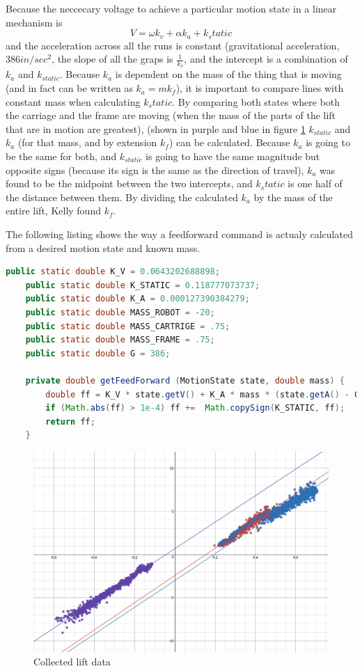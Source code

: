 \documentclass{article}
\begin{document}
Because the neccecary voltage to achieve a particular motion state in a linear mechanism is $$V = \omega k_v + \alpha k_a + k_static$$ 
and the acceleration across all the runs is constant (gravitational acceleration, $386 in/sec^2$, the slope of all the graps is $\frac{1}{k_v}$, and the intercept is a combination of $k_a$ and $k_{static}$. Because $k_a$ is dependent on the mass of the thing that is moving (and in fact can be written as $k_a = m k_f$), it is important to compare lines with constant mass when calculating $k_static$. By comparing both states where both the carriage and the frame are moving (when the mass of the parts of the lift that are in motion are greatest), (shown in purple and blue in figure \ref{fig:liftData} $k_{static}$ and $k_a$ (for that mass, and by extension $k_f$) can be calculated. Because $k_a$ is going to be the same for both, and $k_{static}$ is going to have the same magnitude but opposite signs (because its sign is the same as the direction of travel), $k_a$ was found to be the midpoint between the two intercepts, and $k_static$ is one half of the distance between them. By dividing the calculated $k_a$ by the mass of the entire lift, Kelly found $k_f$. 

The following listing shows the way a feedforward command is actualy calculated from a desired motion state and known mass.
\begin{lstlisting}[language=Java]
    public static double K_V = 0.0643202688898;
    public static double K_STATIC = 0.118777073737;
    public static double K_A = 0.000127390384279;
    public static double MASS_ROBOT = -20;
    public static double MASS_CARTRIGE = .75;
    public static double MASS_FRAME = .75;
    public static double G = 386;

    private double getFeedForward (MotionState state, double mass) {
        double ff = K_V * state.getV() + K_A * mass * (state.getA() - G);
        if (Math.abs(ff) > 1e-4) ff +=  Math.copySign(K_STATIC, ff);
        return ff;
    }
\end{lstlisting}

\begin{figure}
    \centering
    \includegraphics[width=.6\textwidth]{30_03-25/images/graph.png}
    \caption{Collected lift data}
    \label{fig:liftData}
\end{figure}
\end{document}
